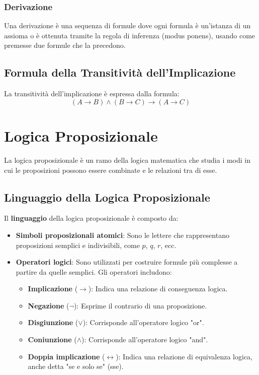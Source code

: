 \documentclass{article}
\begin{document}
\subsubsection{Derivazione}
Una derivazione è una sequenza di formule dove ogni formula è un'istanza di un assioma o è ottenuta tramite la regola di inferenza (modus ponens), usando come premesse due formule che la precedono.

\subsection{Formula della Transitività dell'Implicazione}
La transitività dell'implicazione è espressa dalla formula:
\[(A \to B) \land (B \to C) \to (A \to C)\]

\newpage
\section{Logica Proposizionale}

La logica proposizionale è un ramo della logica matematica che studia i modi in cui le proposizioni possono essere combinate e le relazioni tra di esse.

\subsection{Linguaggio della Logica Proposizionale}
Il \textbf{linguaggio} della logica proposizionale è composto da:
\begin{itemize}
\item \textbf{Simboli proposizionali atomici}: Sono le lettere che rappresentano proposizioni semplici e indivisibili, come $p$, $q$, $r$, ecc.
\item \textbf{Operatori logici}: Sono utilizzati per costruire formule più complesse a partire da quelle semplici. Gli operatori includono:
\begin{itemize}
\item \textbf{Implicazione} ($\to$): Indica una relazione di conseguenza logica.
\item \textbf{Negazione} ($\neg$): Esprime il contrario di una proposizione.
\item \textbf{Disgiunzione} ($\lor$): Corrisponde all'operatore logico "or".
\item \textbf{Coniunzione} ($\land$): Corrisponde all'operatore logico "and".
\item \textbf{Doppia implicazione} ($\leftrightarrow$): Indica una relazione di equivalenza logica, anche detta "se e solo se" (sse).
\end{itemize}
\end{itemize}
\end{document}
